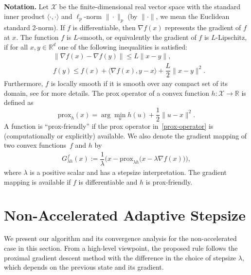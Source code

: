 \documentclass[11pt, a4paper, oneside, reqno]{amsart}
\makeatletter
\newtheorem{assumption}[theorem]{Assumption}
\def\subsection{\@startsection{subsection}{2}%
	\z@{.5\linespacing\@plus.7\linespacing}{.5\linespacing}%
	{\normalfont\large\bfseries}}
\makeatother
\begin{document}
\textbf{Notation.} Let $\mathcal{X}$ be the finite-dimensional real vector space with the standard inner product $\langle \cdot, \cdot \rangle$ and $\ell_p$-norm  $\|\cdot\|_p$ (by $\|\cdot\|$, we mean the Euclidean standard 2-norm). If $f$ is differentiable, then $\nabla f(x)$ represents the gradient of $f$ at $x$. The function $f$ is $L$-smooth, or equivalently the gradient of $f$ is $L$-Lipschitz, if for all $x,y \in \mathbb{R}^d$ one of the following inequalities is satisfied: 
\begin{subequations}\label{smoothness inequality}
\begin{align}
    & \|\nabla f(x) - \nabla f(y)\| \leq L\|x-y\|, \label{eq2} \\
    & f(y) \leq f(x) + \langle \nabla f(x),y-x \rangle + \dfrac{L}{2} \|x-y\|^2. \label{eq1}
\end{align}
\end{subequations}
Furthermore, $f$ is locally smooth if it is smooth over any compact set of its domain, see \cite[Chap. 2]{Nesterov2018} for more details. The prox operator of a convex function $h \colon \mathcal{X} \to \mathbb{R}$ is defined as
\begin{equation}\label{prox-operator}
    \text{prox}_{h}(x) = \arg \min_{u} h(u) + \dfrac{1}{2} \|u-x\|^2.
\end{equation}
A function is ``prox-friendly'' if the prox operator in~\eqref{prox-operator} is (computationally or explicitly) available. We also denote the gradient mapping of two convex functions~$f$ and $h$ by 
\begin{align}
\label{grad_mapping}
G^{f}_{\lambda h}(x) := \dfrac{1}{\lambda}\Big(x - \mathrm{prox}_{\lambda  h}\big(x - \lambda \nabla f(x)\big)\Big),   
\end{align}
where $\lambda$ is a positive scalar and has a stepsize interpretation. The gradient mapping is available if $f$ is differentiable and $h$ is prox-friendly.
\section{Non-Accelerated Adaptive Stepsize} \label{Non-accelerated adaptive stepsize}
We present our algorithm and its convergence analysis for the non-accelerated case in this section. From a high-level viewpoint, the proposed rule follows the proximal gradient descent method with the difference in the choice of stepsize $\lambda$, which depends on the previous state and its gradient.
\end{document}
